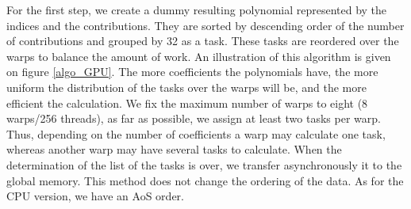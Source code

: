 \documentclass[oribibl]{llncs2e/llncs}
\begin{document}
For the first step, we create a dummy resulting polynomial  represented by the indices and the contributions. They are sorted by descending order of the number of contributions
and grouped by 32 as a task. These tasks are reordered over the warps to balance the amount of work. An illustration of this algorithm is given on  figure \ref{algo_GPU}. 
The more coefficients the polynomials have, the more uniform the distribution of the tasks over the warps will be, and the more efficient the calculation.
We fix the maximum number of warps to eight (8 warps/256 threads), as far as possible, we assign at least two tasks per warp.
Thus, depending on  the number of coefficients a warp may calculate one task, whereas another warp may have several tasks to calculate.
 When the determination of the list of the tasks is over,  we transfer  asynchronously it to the global memory.
This method does not  change the ordering of the data. As for the CPU version, we have an AoS order.
\end{document}

